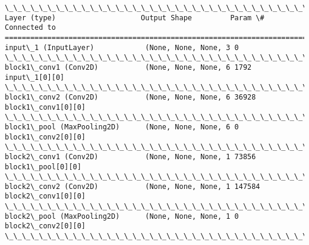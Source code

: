\documentclass[11pt]{article}
\begin{document}
    \begin{Verbatim}[commandchars=\\\{\}]
\_\_\_\_\_\_\_\_\_\_\_\_\_\_\_\_\_\_\_\_\_\_\_\_\_\_\_\_\_\_\_\_\_\_\_\_\_\_\_\_\_\_\_\_\_\_\_\_\_\_\_\_\_\_\_\_\_\_\_\_\_\_\_\_\_\_\_\_\_\_\_\_\_\_\_\_\_\_\_\_\_\_\_\_\_\_\_\_\_\_\_\_\_\_\_\_\_\_
Layer (type)                    Output Shape         Param \#     Connected to                     
==================================================================================================
input\_1 (InputLayer)            (None, None, None, 3 0                                            
\_\_\_\_\_\_\_\_\_\_\_\_\_\_\_\_\_\_\_\_\_\_\_\_\_\_\_\_\_\_\_\_\_\_\_\_\_\_\_\_\_\_\_\_\_\_\_\_\_\_\_\_\_\_\_\_\_\_\_\_\_\_\_\_\_\_\_\_\_\_\_\_\_\_\_\_\_\_\_\_\_\_\_\_\_\_\_\_\_\_\_\_\_\_\_\_\_\_
block1\_conv1 (Conv2D)           (None, None, None, 6 1792        input\_1[0][0]                    
\_\_\_\_\_\_\_\_\_\_\_\_\_\_\_\_\_\_\_\_\_\_\_\_\_\_\_\_\_\_\_\_\_\_\_\_\_\_\_\_\_\_\_\_\_\_\_\_\_\_\_\_\_\_\_\_\_\_\_\_\_\_\_\_\_\_\_\_\_\_\_\_\_\_\_\_\_\_\_\_\_\_\_\_\_\_\_\_\_\_\_\_\_\_\_\_\_\_
block1\_conv2 (Conv2D)           (None, None, None, 6 36928       block1\_conv1[0][0]               
\_\_\_\_\_\_\_\_\_\_\_\_\_\_\_\_\_\_\_\_\_\_\_\_\_\_\_\_\_\_\_\_\_\_\_\_\_\_\_\_\_\_\_\_\_\_\_\_\_\_\_\_\_\_\_\_\_\_\_\_\_\_\_\_\_\_\_\_\_\_\_\_\_\_\_\_\_\_\_\_\_\_\_\_\_\_\_\_\_\_\_\_\_\_\_\_\_\_
block1\_pool (MaxPooling2D)      (None, None, None, 6 0           block1\_conv2[0][0]               
\_\_\_\_\_\_\_\_\_\_\_\_\_\_\_\_\_\_\_\_\_\_\_\_\_\_\_\_\_\_\_\_\_\_\_\_\_\_\_\_\_\_\_\_\_\_\_\_\_\_\_\_\_\_\_\_\_\_\_\_\_\_\_\_\_\_\_\_\_\_\_\_\_\_\_\_\_\_\_\_\_\_\_\_\_\_\_\_\_\_\_\_\_\_\_\_\_\_
block2\_conv1 (Conv2D)           (None, None, None, 1 73856       block1\_pool[0][0]                
\_\_\_\_\_\_\_\_\_\_\_\_\_\_\_\_\_\_\_\_\_\_\_\_\_\_\_\_\_\_\_\_\_\_\_\_\_\_\_\_\_\_\_\_\_\_\_\_\_\_\_\_\_\_\_\_\_\_\_\_\_\_\_\_\_\_\_\_\_\_\_\_\_\_\_\_\_\_\_\_\_\_\_\_\_\_\_\_\_\_\_\_\_\_\_\_\_\_
block2\_conv2 (Conv2D)           (None, None, None, 1 147584      block2\_conv1[0][0]               
\_\_\_\_\_\_\_\_\_\_\_\_\_\_\_\_\_\_\_\_\_\_\_\_\_\_\_\_\_\_\_\_\_\_\_\_\_\_\_\_\_\_\_\_\_\_\_\_\_\_\_\_\_\_\_\_\_\_\_\_\_\_\_\_\_\_\_\_\_\_\_\_\_\_\_\_\_\_\_\_\_\_\_\_\_\_\_\_\_\_\_\_\_\_\_\_\_\_
block2\_pool (MaxPooling2D)      (None, None, None, 1 0           block2\_conv2[0][0]               
\_\_\_\_\_\_\_\_\_\_\_\_\_\_\_\_\_\_\_\_\_\_\_\_\_\_\_\_\_\_\_\_\_\_\_\_\_\_\_\_\_\_\_\_\_\_\_\_\_\_\_\_\_\_\_\_\_\_\_\_\_\_\_\_\_\_\_\_\_\_\_\_\_\_\_\_\_\_\_\_\_\_\_\_\_\_\_\_\_\_\_\_\_\_\_\_\_\_

\end{Verbatim}
\end{document}
